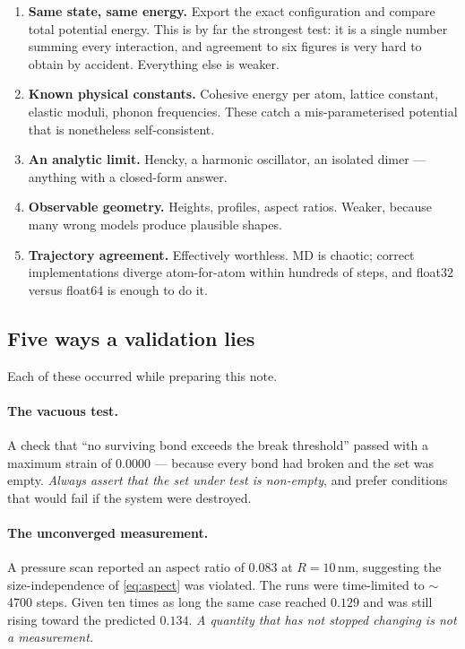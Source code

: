 \documentclass[11pt,a4paper]{article}
\begin{document}
\begin{enumerate}
\item \textbf{Same state, same energy.} Export the exact configuration and
      compare total potential energy. This is by far the strongest test: it is
      a single number summing every interaction, and agreement to six figures
      is very hard to obtain by accident. Everything else is weaker.
\item \textbf{Known physical constants.} Cohesive energy per atom, lattice
      constant, elastic moduli, phonon frequencies. These catch a
      mis-parameterised potential that is nonetheless self-consistent.
\item \textbf{An analytic limit.} Hencky, a harmonic oscillator, an isolated
      dimer --- anything with a closed-form answer.
\item \textbf{Observable geometry.} Heights, profiles, aspect ratios. Weaker,
      because many wrong models produce plausible shapes.
\item \textbf{Trajectory agreement.} Effectively worthless. MD is chaotic;
      correct implementations diverge atom-for-atom within hundreds of steps,
      and float32 versus float64 is enough to do it.
\end{enumerate}

\subsection{Five ways a validation lies}

Each of these occurred while preparing this note.

\paragraph{The vacuous test.} A check that ``no surviving bond exceeds the break
threshold'' passed with a maximum strain of $0.0000$ --- because every bond had
broken and the set was empty. \emph{Always assert that the set under test is
non-empty}, and prefer conditions that would fail if the system were destroyed.

\paragraph{The unconverged measurement.} A pressure scan reported an aspect
ratio of $0.083$ at $R = 10$\,nm, suggesting the size-independence of
\eqref{eq:aspect} was violated. The runs were time-limited to $\sim$4700 steps.
Given ten times as long the same case reached $0.129$ and was still rising
toward the predicted $0.134$. \emph{A quantity that has not stopped changing is
not a measurement.}
\end{document}
